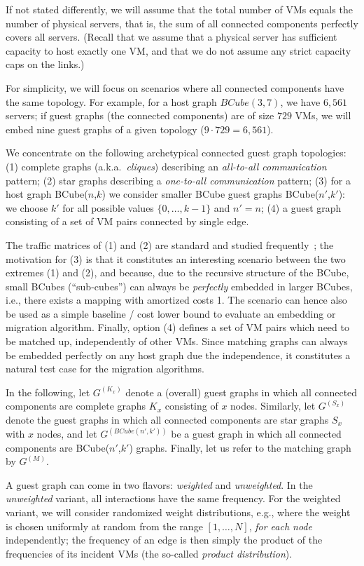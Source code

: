 \documentclass[conference]{IEEEtran}
\def\BC#1#2{BCube(#1,#2)}
\begin{document}
If not stated differently, we will assume that the total number of VMs equals the number of physical servers, that is,
the sum of all connected components perfectly covers all servers. (Recall that we assume that a physical server has sufficient capacity to host exactly one VM, and that
we do not assume any strict capacity caps on the links.)

For simplicity, we will focus on scenarios where all connected components have the same topology.
For example, for a host graph $\BC{3}{7}$, we have $6,561$ servers; if guest graphs (the connected components)
are of size $729$ VMs, we will embed nine guest graphs of a given topology ($9\cdot 729 = 6,561$).

We concentrate on the following archetypical connected guest graph topologies: (1) complete graphs (a.k.a.~\emph{cliques}) describing
an \emph{all-to-all communication} pattern; (2)
star graphs describing a \emph{one-to-all communication} pattern; (3) for a host graph \BC{$n$}{$k$}
we consider smaller BCube guest graphs \BC{$n'$}{$k'$}:
we choose $k'$ for all possible values $\{0,\ldots,k-1\}$ and $n' = n$; (4) a guest graph consisting of a set of VM pairs connected by single edge.

The traffic matrices of (1) and (2) are standard and studied frequently~\cite{podc11}; the motivation for (3) is that it constitutes an interesting scenario
between the two extremes (1) and (2), and because, due to the recursive structure of the BCube, small BCubes (``sub-cubes'') can always be \emph{perfectly} embedded
in larger BCubes, i.e., there exists a mapping with amortized costs 1. The scenario can hence also be used as a simple baseline / cost lower bound to evaluate an embedding or migration algorithm. Finally, option (4) defines a set of VM pairs which need to be matched up, independently of other VMs. Since matching graphs can always be embedded perfectly on any host graph due the independence, it constitutes a natural test case for the migration algorithms.

In the following, let $G^{(K_{x})}$ denote a (overall) guest graphs in which all connected components are complete graphs $K_{x}$ consisting of $x$ nodes. Similarly, let $G^{(S_{x})}$ denote the guest graphs in which all connected components are star graphs $S_{x}$ with $x$ nodes, and let $G^{(\BC{n'}{k'})}$ be a guest graph in which all connected components are \BC{$n'$}{$k'$} graphs. Finally, let us refer to the matching graph by $G^{(M)}$.

A guest graph can come in two flavors: \emph{weighted} and \emph{unweighted}. In the \emph{unweighted} variant, all interactions have the same frequency.
For the weighted variant, we will consider randomized weight distributions, e.g., where the weight is chosen uniformly at random from the range $[1,\ldots,N]$, \emph{for each node} independently; the frequency of an edge is then simply the product of the frequencies of its incident VMs (the so-called \emph{product distribution}).
\end{document}
